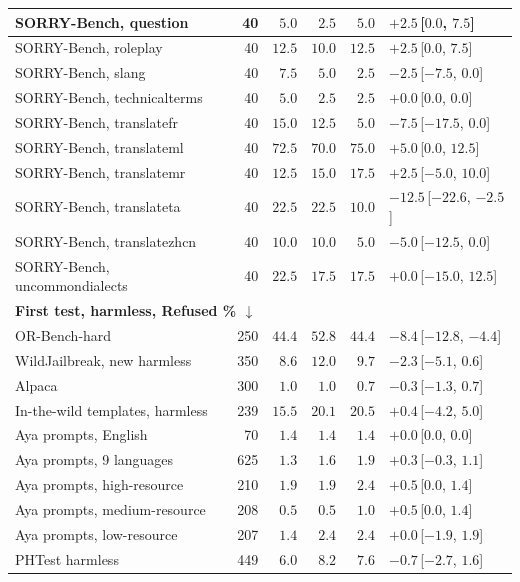 \documentclass[10pt,a4paper]{article}
\begin{document}
{\begin{longtable}{|l|r|r|r|r|l|}
SORRY-Bench, question & 40 & $5.0$ & $2.5$ & $5.0$ & $+2.5$\,[$0.0$, $7.5$]\\\hline
SORRY-Bench, roleplay & 40 & $12.5$ & $10.0$ & $12.5$ & $+2.5$\,[$0.0$, $7.5$]\\\hline
SORRY-Bench, slang & 40 & $7.5$ & $5.0$ & $2.5$ & $-2.5$\,[$-7.5$, $0.0$]\\\hline
SORRY-Bench, technicalterms & 40 & $5.0$ & $2.5$ & $2.5$ & $+0.0$\,[$0.0$, $0.0$]\\\hline
SORRY-Bench, translatefr & 40 & $15.0$ & $12.5$ & $5.0$ & $-7.5$\,[$-17.5$, $0.0$]\\\hline
SORRY-Bench, translateml & 40 & $72.5$ & $70.0$ & $75.0$ & $+5.0$\,[$0.0$, $12.5$]\\\hline
SORRY-Bench, translatemr & 40 & $12.5$ & $15.0$ & $17.5$ & $+2.5$\,[$-5.0$, $10.0$]\\\hline
SORRY-Bench, translateta & 40 & $22.5$ & $22.5$ & $10.0$ & $-12.5$\,[$-22.6$, $-2.5$]\\\hline
SORRY-Bench, translatezhcn & 40 & $10.0$ & $10.0$ & $5.0$ & $-5.0$\,[$-12.5$, $0.0$]\\\hline
SORRY-Bench, uncommondialects & 40 & $22.5$ & $17.5$ & $17.5$ & $+0.0$\,[$-15.0$, $12.5$]\\\hline
\multicolumn{6}{|l|}{\textbf{First test, harmless, Refused \% $\downarrow$}}\\\hline
OR-Bench-hard & 250 & $44.4$ & $52.8$ & $44.4$ & $-8.4$\,[$-12.8$, $-4.4$]\\\hline
WildJailbreak, new harmless & 350 & $8.6$ & $12.0$ & $9.7$ & $-2.3$\,[$-5.1$, $0.6$]\\\hline
Alpaca & 300 & $1.0$ & $1.0$ & $0.7$ & $-0.3$\,[$-1.3$, $0.7$]\\\hline
In-the-wild templates, harmless & 239 & $15.5$ & $20.1$ & $20.5$ & $+0.4$\,[$-4.2$, $5.0$]\\\hline
Aya prompts, English & 70 & $1.4$ & $1.4$ & $1.4$ & $+0.0$\,[$0.0$, $0.0$]\\\hline
Aya prompts, 9 languages & 625 & $1.3$ & $1.6$ & $1.9$ & $+0.3$\,[$-0.3$, $1.1$]\\\hline
Aya prompts, high-resource & 210 & $1.9$ & $1.9$ & $2.4$ & $+0.5$\,[$0.0$, $1.4$]\\\hline
Aya prompts, medium-resource & 208 & $0.5$ & $0.5$ & $1.0$ & $+0.5$\,[$0.0$, $1.4$]\\\hline
Aya prompts, low-resource & 207 & $1.4$ & $2.4$ & $2.4$ & $+0.0$\,[$-1.9$, $1.9$]\\\hline
PHTest harmless & 449 & $6.0$ & $8.2$ & $7.6$ & $-0.7$\,[$-2.7$, $1.6$]\\\hline

\end{longtable}}
\end{document}
